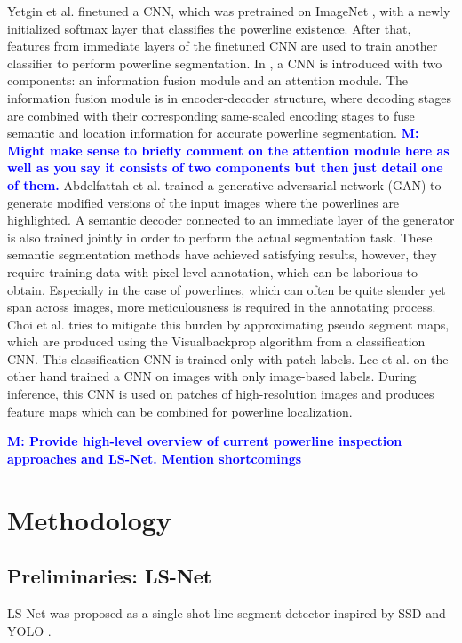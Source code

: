 \documentclass[journal]{IEEEtran}
\newcommand{\commentM}[1]{\textbf{\textcolor{blue}{M: #1}}}
\begin{document}
Yetgin et al. \cite{related_work_omer_emre_yetgin_2018} finetuned a CNN, which was pretrained on ImageNet \cite{deng2009imagenet}, with a newly initialized softmax layer that classifies the powerline existence. After that, features from immediate layers of the finetuned CNN are used to train another classifier to perform powerline segmentation. In \cite{related_work_yan_li_2019}, a CNN is introduced with two components: an information fusion module and an attention module. The information fusion module is in encoder-decoder structure, where decoding stages are combined with their corresponding same-scaled encoding stages to fuse semantic and location information for accurate powerline segmentation. \commentM{Might make sense to briefly comment on the attention module here as well as you say it consists of two components but then just detail one of them.} Abdelfattah et al. \cite{related_work_rabab_abdelfattah_2022} trained a generative adversarial network (GAN) to generate modified versions of the input images where the powerlines are highlighted. A semantic decoder connected to an immediate layer of the generator is also trained jointly in order to perform the actual segmentation task. These semantic segmentation methods have achieved satisfying results, however, they require training data with pixel-level annotation, which can be laborious to obtain. Especially in the case of powerlines, which can often be quite slender yet span across images, more meticulousness is required in the annotating process. Choi et al. \cite{related_work_hyeyeon_choi_2021} tries to mitigate this burden by approximating pseudo segment maps, which are produced using the Visualbackprop algorithm \cite{vbp} from a classification CNN. This classification CNN is trained only with patch labels. Lee et al. \cite{related_work_sang_jun_lee_2017} on the other hand trained a CNN on images with only image-based labels. During inference, this CNN is used on patches of high-resolution images and produces feature maps which can be combined for powerline localization. 

\commentM{Provide high-level overview of current powerline inspection approaches and LS-Net. Mention shortcomings}

\section{Methodology}

\subsection{Preliminaries: LS-Net}
LS-Net \cite{Nguyen2020} was proposed as a single-shot line-segment detector inspired by SSD \cite{SSD} and YOLO \cite{YOLO}. 
\end{document}

